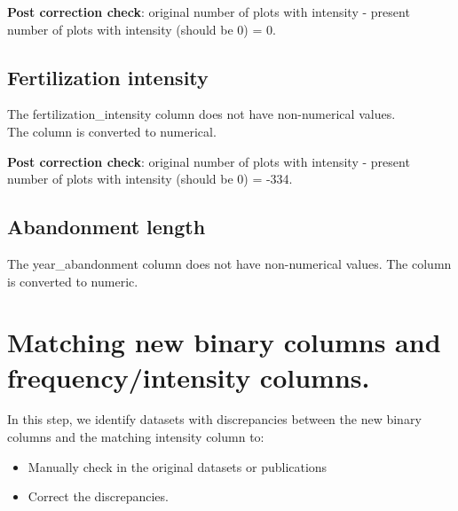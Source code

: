 \documentclass[table]{article}
\newenvironment{Shaded}{\begin{snugshade}}{\end{snugshade}}
\newcommand{\KeywordTok}[1]{\textcolor[rgb]{0.13,0.29,0.53}{\textbf{#1}}}
\newcommand{\StringTok}[1]{\textcolor[rgb]{0.31,0.60,0.02}{#1}}
\newcommand{\OperatorTok}[1]{\textcolor[rgb]{0.81,0.36,0.00}{\textbf{#1}}}
\newcommand{\NormalTok}[1]{#1}
\providecommand{\tightlist}{%
  \setlength{\itemsep}{0pt}\setlength{\parskip}{0pt}}
\begin{document}
\textbf{Post correction check}: original number of plots with intensity
- present number of plots with intensity (should be 0) = 0.

\subsection{Fertilization intensity}\label{fertilization-intensity}

The fertilization\_intensity column does not have non-numerical
values.\\
The column is converted to numerical.

\begin{Shaded}
\end{Shaded}

\textbf{Post correction check}: original number of plots with intensity
- present number of plots with intensity (should be 0) = -334.

\subsection{Abandonment length}\label{abandonment-length}

The year\_abandonment column does not have non-numerical values. The
column is converted to numeric.

\begin{Shaded}
\end{Shaded}

\section{Matching new binary columns and frequency/intensity
columns.}\label{matching-new-binary-columns-and-frequencyintensity-columns.}

In this step, we identify datasets with discrepancies between the new
binary columns and the matching intensity column to:

\begin{itemize}
\tightlist
\item
  Manually check in the original datasets or publications
\item
  Correct the discrepancies.
\end{itemize}
\end{document}
